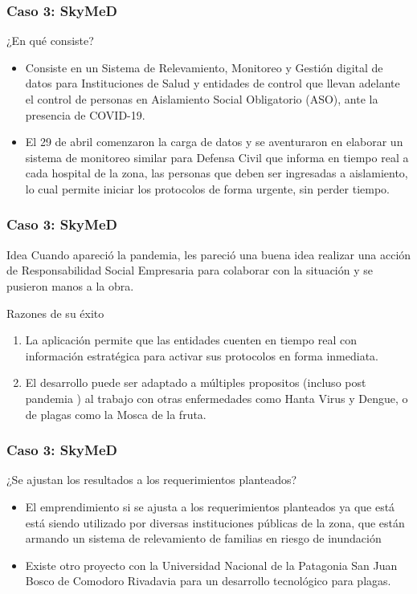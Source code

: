 \documentclass[11pt]{beamer}
\begin{document}
    \begin{frame}
    	\frametitle{Caso 3: SkyMeD}
    	\begin{block}{¿En qué consiste?}
    		\begin{itemize}
    			\item Consiste en un Sistema de Relevamiento, Monitoreo y Gestión digital de datos para Instituciones de Salud y entidades de control que llevan adelante el control de personas en Aislamiento Social Obligatorio (ASO), ante la presencia de COVID-19.
    			\item  El 29 de abril comenzaron la carga de datos y se aventuraron en elaborar un sistema de monitoreo similar para Defensa Civil que informa en tiempo real a cada hospital de la zona, las personas que deben ser ingresadas a aislamiento, lo cual permite iniciar los protocolos de forma urgente, sin perder tiempo.
    		\end{itemize}
    	\end{block}
    \end{frame}
   
    \begin{frame}
    	\frametitle{Caso 3: SkyMeD}
    	\begin{block}{Idea}
    		Cuando apareció la pandemia, les pareció una buena idea realizar una acción de Responsabilidad Social Empresaria para colaborar con la situación y se pusieron manos a la obra.
    	\end{block}
        \pause
    	\begin{block}{Razones de su éxito}
    		\begin{enumerate}
    			\item La aplicación permite que las entidades cuenten en tiempo real con información estratégica para activar sus protocolos en forma inmediata.
    			\pause
    			\item El desarrollo puede ser adaptado a múltiples propositos (incluso post pandemia ) al trabajo con otras enfermedades como Hanta Virus y Dengue, o de plagas como la Mosca de la fruta.
    		\end{enumerate}
    	\end{block}
    \end{frame}

    \begin{frame}
    	\frametitle{Caso 3: SkyMeD}
    	\begin{block}{¿Se ajustan los resultados a los requerimientos planteados?}
    		\begin{itemize}
    			\item El emprendimiento si se ajusta a los requerimientos planteados ya que está está siendo utilizado por diversas instituciones públicas de la zona, que están armando un sistema de relevamiento de familias en riesgo de inundación
    			\item Existe otro proyecto con la Universidad Nacional de la Patagonia San Juan Bosco de Comodoro Rivadavia para un desarrollo tecnológico para plagas.
    		\end{itemize}
    	\end{block}
    \end{frame}
    
\end{document}
